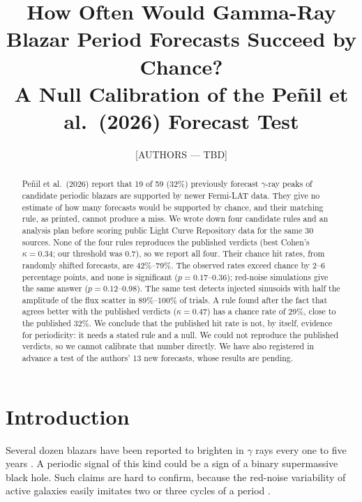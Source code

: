 \documentclass[twocolumn]{aastex631}
\begin{document}
\title{How Often Would Gamma-Ray Blazar Period Forecasts Succeed by Chance?\\
A Null Calibration of the Pe\~nil et al.\ (2026) Forecast Test}

\author{[AUTHORS --- TBD]}

\begin{abstract}
Pe\~nil et al.\ (2026) report that 19 of 59 (32\%) previously forecast $\gamma$-ray peaks of candidate periodic blazars are supported by newer Fermi-LAT data. They give no estimate of how many forecasts would be supported by chance, and their matching rule, as printed, cannot produce a miss. We wrote down four candidate rules and an analysis plan before scoring public Light Curve Repository data for the same 30 sources. None of the four rules reproduces the published verdicts (best Cohen's $\kappa = 0.34$; our threshold was 0.7), so we report all four. Their chance hit rates, from randomly shifted forecasts, are 42\%--79\%. The observed rates exceed chance by 2--6 percentage points, and none is significant ($p = 0.17$--0.36); red-noise simulations give the same answer ($p = 0.12$--0.98). The same test detects injected sinusoids with half the amplitude of the flux scatter in 89\%--100\% of trials. A rule found after the fact that agrees better with the published verdicts ($\kappa = 0.47$) has a chance rate of 29\%, close to the published 32\%. We conclude that the published hit rate is not, by itself, evidence for periodicity: it needs a stated rule and a null. We could not reproduce the published verdicts, so we cannot calibrate that number directly. We have also registered in advance a test of the authors' 13 new forecasts, whose results are pending.
\end{abstract}


\section{Introduction} \label{sec:intro}

Several dozen blazars have been reported to brighten in $\gamma$ rays every one to five years \citep[e.g.][]{penil25c, rico25}. A periodic signal of this kind could be a sign of a binary supermassive black hole. Such claims are hard to confirm, because the red-noise variability of active galaxies easily imitates two or three cycles of a period \citep{vaughan16}.
\end{document}
